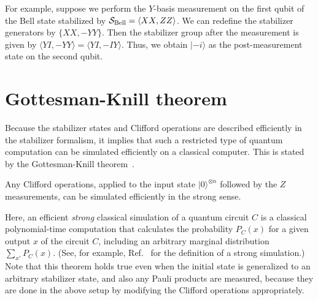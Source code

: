 For example, suppose we perform the $Y$-basis measurement on the first qubit of the Bell state stabilized by $\mathcal{S}_{\rm Bell}=\langle XX, ZZ\rangle$.
We can redefine the stabilizer generators by $\{XX, -YY\}$.
Then the stabilizer group after the measurement is given by $\langle YI,-YY \rangle = \langle YI, -IY \rangle$.
Thus, we obtain $|-i\rangle$ as the post-measurement state on the second qubit.

\section{Gottesman-Knill theorem}
\label{sec:GKtheorem}
Because the stabilizer states and Clifford operations are described efficiently in the stabilizer formalism, it implies that such a restricted type of quantum computation can be simulated efficiently on a classical computer.
This is stated by the Gottesman-Knill theorem~\cite{Gottesman,GottesmanHeisenberg,NielsenChuang}.

\begin{theorem}
Any Clifford operations, applied to the input state $|0\rangle^{\otimes n}$ followed by the $Z$ measurements, can be simulated efficiently in the strong sense.
\label{GKtheorem}
\end{theorem}
Here, an efficient {\it strong} classical simulation of a quantum circuit $C$ is a classical polynomial-time computation that calculates the probability $P_{C}(x)$ 
for a given output $x$ of the circuit $C$,
including an arbitrary marginal distribution $\sum _{x'} P_{C}(x)$. 
(See, for example, Ref.~\cite{IQP} for the definition of a strong simulation.)
Note that this theorem holds true even when the initial state is generalized to an arbitrary stabilizer state, and also any Pauli products are measured, because they are done in the above setup by modifying the Clifford operations appropriately.



